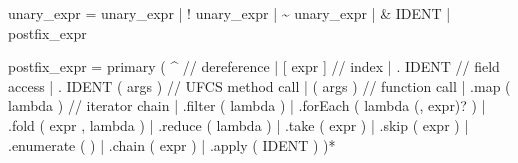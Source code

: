 \documentclass[
  11pt,
]{article}
\newenvironment{Shaded}{\begin{snugshade}}{\end{snugshade}}
\newcommand{\NormalTok}[1]{#1}
\begin{document}
\begin{Shaded}
\begin{Highlighting}[]
\NormalTok{unary\_expr     = \textquotesingle{}{-}\textquotesingle{} unary\_expr | \textquotesingle{}!\textquotesingle{} unary\_expr | \textquotesingle{}\textasciitilde{}\textquotesingle{} unary\_expr}
\NormalTok{               | \textquotesingle{}\&\textquotesingle{} IDENT | postfix\_expr}

\NormalTok{postfix\_expr   = primary}
\NormalTok{                 ( \textquotesingle{}\^{}\textquotesingle{}                              // dereference}
\NormalTok{                 | \textquotesingle{}[\textquotesingle{} expr \textquotesingle{}]\textquotesingle{}                    // index}
\NormalTok{                 | \textquotesingle{}.\textquotesingle{} IDENT                       // field access}
\NormalTok{                 | \textquotesingle{}.\textquotesingle{} IDENT \textquotesingle{}(\textquotesingle{} args \textquotesingle{})\textquotesingle{}          // UFCS method call}
\NormalTok{                 | \textquotesingle{}(\textquotesingle{} args \textquotesingle{})\textquotesingle{}                    // function call}
\NormalTok{                 | \textquotesingle{}.map\textquotesingle{} \textquotesingle{}(\textquotesingle{} lambda \textquotesingle{})\textquotesingle{}           // iterator chain}
\NormalTok{                 | \textquotesingle{}.filter\textquotesingle{} \textquotesingle{}(\textquotesingle{} lambda \textquotesingle{})\textquotesingle{}}
\NormalTok{                 | \textquotesingle{}.forEach\textquotesingle{} \textquotesingle{}(\textquotesingle{} lambda (\textquotesingle{},\textquotesingle{} expr)? \textquotesingle{})\textquotesingle{}}
\NormalTok{                 | \textquotesingle{}.fold\textquotesingle{} \textquotesingle{}(\textquotesingle{} expr \textquotesingle{},\textquotesingle{} lambda \textquotesingle{})\textquotesingle{}}
\NormalTok{                 | \textquotesingle{}.reduce\textquotesingle{} \textquotesingle{}(\textquotesingle{} lambda \textquotesingle{})\textquotesingle{}}
\NormalTok{                 | \textquotesingle{}.take\textquotesingle{} \textquotesingle{}(\textquotesingle{} expr \textquotesingle{})\textquotesingle{}}
\NormalTok{                 | \textquotesingle{}.skip\textquotesingle{} \textquotesingle{}(\textquotesingle{} expr \textquotesingle{})\textquotesingle{}}
\NormalTok{                 | \textquotesingle{}.enumerate\textquotesingle{} \textquotesingle{}(\textquotesingle{} \textquotesingle{})\textquotesingle{}}
\NormalTok{                 | \textquotesingle{}.chain\textquotesingle{} \textquotesingle{}(\textquotesingle{} expr \textquotesingle{})\textquotesingle{}}
\NormalTok{                 | \textquotesingle{}.apply\textquotesingle{} \textquotesingle{}(\textquotesingle{} IDENT \textquotesingle{})\textquotesingle{}}
\NormalTok{                 )*}


\end{Highlighting}
\end{Shaded}
\end{document}
